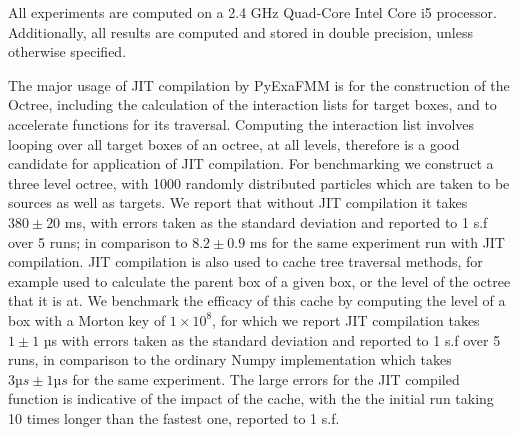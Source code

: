 All experiments are computed on a 2.4 GHz Quad-Core Intel Core i5 processor.
Additionally, all results are computed and stored in double precision, unless
otherwise specified.

The major usage of \gls{JIT} compilation by \gls{PyExaFMM} is for the construction
of the Octree, including the calculation of the interaction lists for target
boxes, and to accelerate functions for its traversal. Computing the interaction list
involves looping over all target boxes of an octree, at all levels, therefore
is a good candidate for application of \gls{JIT} compilation. For benchmarking
we construct a three level octree, with 1000 randomly distributed particles which are
taken to be sources as well as targets. We report that without \gls{JIT} compilation
it takes $380 \pm 20$ ms, with errors taken as the standard deviation
and reported to 1 s.f over 5 runs; in comparison
to $8.2 \pm 0.9$ ms for the same experiment run with \gls{JIT} compilation.
\gls{JIT} compilation is also used to cache tree traversal methods, for example
used to calculate the parent box of a given box, or the level of the octree that
it is at. We benchmark the efficacy of this cache by computing the level
of a box with a Morton key of $1 \times 10^8$, for which we report \gls{JIT} compilation
takes $1 \pm 1$ µs with errors taken as the standard deviation and reported
to 1 s.f over 5 runs, in comparison to the ordinary Numpy implementation which takes
$3 µs ± 1 µs$ for the same experiment. The large errors for the \gls{JIT} compiled
function is indicative of the impact of the cache, with the the initial
run taking 10 times longer than the fastest one, reported to 1 s.f.

